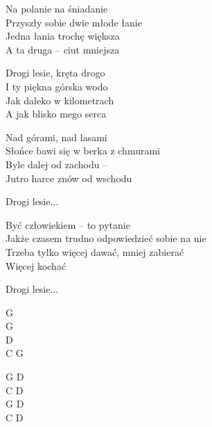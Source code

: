 \begin{text}
    Na polanie na śniadanie\\
    Przyszły sobie dwie młode łanie\\
    Jedna łania trochę większa\\
    A ta druga – ciut mniejsza

    \vin Drogi lesie, kręta drogo\\
    \vin I ty piękna górska wodo\\
    \vin Jak daleko w kilometrach\\
    \vin A jak blisko mego serca

    Nad górami, nad lasami\\
    Słońce bawi się w berka z chmurami\\
    Byle dalej od zachodu –\\
    Jutro harce znów od wschodu

    \vin Drogi lesie...

    Być człowiekiem – to pytanie\\
    Jakże czasem trudno odpowiedzieć sobie na nie\\
    Trzeba tylko więcej dawać, mniej zabierać\\
    Więcej kochać

    \vin Drogi lesie...
\end{text}
\begin{chord}
    G\\
    G\\
    D\\
    C G

    G D\\
    C D\\
    G D\\
    C D
\end{chord}